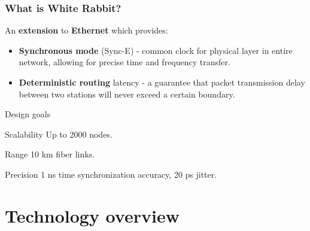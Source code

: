 \documentclass[xcolor=dvipsnames]{beamer}
\begin{document}
\frame
{
  \frametitle{What is White Rabbit?}

\begin{block}{}
  An \textbf{extension} to \textbf{Ethernet} which provides:
  \begin{itemize}
  \item \textbf{Synchronous mode} (Sync-E) - common clock for physical layer in entire network, allowing for precise time and frequency transfer.

\item \textbf{Deterministic routing} latency - a guarantee that packet transmission delay between two stations will never exceed a certain boundary.
\end{itemize}
\end{block}

}

\begin{frame}{Design goals}
\begin{block}{Scalability}
Up to 2000 nodes.
\end{block}

\begin{block}{Range}
10 km fiber links.
\end{block}

\begin{block}{Precision}
1 ns time synchronization accuracy, 20 ps jitter.
\end{block}

\end{frame}

\section{Technology overview}


\end{document}
